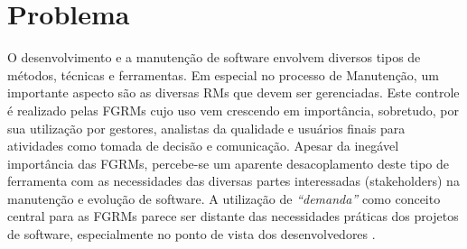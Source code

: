 %

%

\section{Problema}
\label{sec:intro-problema}

O desenvolvimento e a manutenção de software envolvem diversos tipos de métodos,
técnicas e ferramentas. Em especial no processo de Manutenção, um importante
aspecto são as diversas RMs que devem ser gerenciadas. Este controle é realizado
pelas FGRMs cujo uso vem crescendo em importância, sobretudo, por sua utilização
por gestores, analistas da qualidade e usuários finais para atividades como
tomada de decisão e comunicação. Apesar da inegável importância das FGRMs,
percebe-se um aparente desacoplamento deste tipo de ferramenta com as
necessidades das diversas partes interessadas (stakeholders) na manutenção e
evolução de software. A utilização de \textit{``demanda''} como conceito central
para as FGRMs parece ser distante das necessidades práticas dos projetos de
software, especialmente no ponto de vista dos desenvolvedores
\cite{Baysal:2013:SAP:2486788.2486957}.

